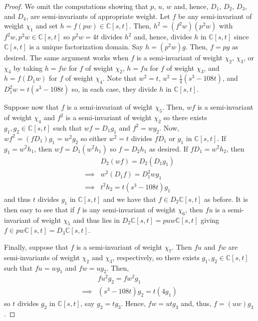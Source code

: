 \documentclass[a4paper,reqno]{amsart}
\theoremstyle{definition}
\theoremstyle{remark} \newtheorem{remark}[theorem]{Remark}
\numberwithin{equation}{section}
\begin{document}
\begin{proof}
    We omit the computations showing that \(p,\, u,\, w\) and, hence, \(D_1,\, D_2,\, D_3,\,\) and \(D_4\), are semi-invariants of appropriate weight. Let \(f\) be any semi-invariant of weight \(\chi_1\) and set \(h = f(pw) \in \mathbb{C}[s,t]\). Then, \(h^2 = (f^2w)(p^2w)\) with \(f^2w,p^2w \in \mathbb{C}[s,t]\) so \(p^2w = 4t\) divides \(h^2\) and, hence, divides \(h\) in \(\mathbb{C}[s,t]\) since \(\mathbb{C}[s,t]\) is a unique factorization domain. Say \(h = (p^2w)g\). Then, \(f = pg\) as desired. The same argument works when \(f\) is a semi-invariant of weight \(\chi_2,\, \chi_3\), or \(\chi_4\) by taking \(h = fw\) for \(f\) of weight \(\chi_2,\, h = fu\) for \(f\) of weight \(\chi_3\), and \(h = f(D_1w)\) for \(f\) of weight \(\chi_4\). Note that \(w^2 = t,\, u^2 = \frac{1}{4}(s^3 - 108t)\), and \(D_1^2w = t(s^3 - 108t)\) so, in each case, they divide \(h\) in \(\mathbb{C}[s,t]\).

    Suppose now that \(f\) is a semi-invariant of weight \(\chi_5\). Then, \(wf\) is a semi-invariant of weight \(\chi_4\) and \(f^2\) is a semi-invariant of weight \(\chi_2\) so there exists \(g_1,g_2 \in \mathbb{C}[s,t]\) such that \(wf = D_1g_1\) and \(f^2 = wg_2\). Now, \(wf^2 = (fD_1)g_1 = w^2g_2\) so either \(w^2 = t\) divides \(fD_1\) or \(g_1\) in \(\mathbb{C}[s,t]\). If \(g_1 = w^2h_1\), then \(wf = D_1(w^2h_1)\) so \(f = D_2h_1\) as desired. If \(fD_1 = w^2h_2\), then 
    \begin{align*}
        &D_2(wf) = D_2(D_1g_1) \\
        \implies & w^2(D_1f) = D_1^2wg_1 \\
        \implies &t^2h_2 = t(s^3-108t)g_1
    \end{align*}
    and thus \(t\) divides \(g_1\) in \(\mathbb{C}[s,t]\) and we have that \(f\in D_2\mathbb{C}[s,t]\) as before. It is then easy to see that if \(f\) is any semi-invariant of weight \(\chi_6\), then \(fu\) is a semi-invariant of weight \(\chi_5\) and thus lies in \(D_2\mathbb{C}[s,t] = puw\mathbb{C}[s,t]\) giving \(f \in pw\mathbb{C}[s,t] = D_3\mathbb{C}[s,t]\).

    Finally, suppose that \(f\) is a semi-invariant of weight \(\chi_7\). Then \(fu\) and \(fw\) are semi-invariants of weight \(\chi_2\) and \(\chi_3\), respectively, so there exists \(g_1,g_2 \in \mathbb{C}[s,t]\) such that \(fu = wg_1\) and \(fw = ug_2\). Then, 
    \begin{align*}
        &fu^2g_2 = fw^2g_1 \\
        \implies & (s^3 - 108t)g_2 = t(4g_1)
    \end{align*}
    so \(t\) divides \(g_2\) in \(\mathbb{C}[s,t]\), say \(g_2 = tg_3\). Hence, \(fw = utg_3\) and, thus, \(f = (uw)g_3\).
\end{proof}
\end{document}
